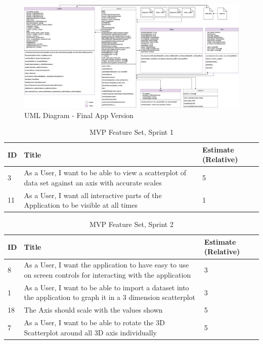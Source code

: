 
\begin{figure}[h]
    \centering
    \includegraphics[width=1\textwidth]{author-files/figures/UML_All_fin.drawio.png}
    \caption{UML Diagram - Final App Version}
    \label{fig:graphfin}
\end{figure}

\begin{table}[h]
    \begin{tabularx}{\textwidth}{ | X | X | X | }
        \hline
        ID & Title                                                                                               & Estimate (Relative) \\
        \hline
        3  & As a User, I want to be able to view a scatterplot of data set against an axis with accurate scales & 5                   \\
        \hline
        11 & As a User, I want all interactive parts of the Application to be visible at all times               & 1                   \\
        \hline
    \end{tabularx}
    \caption{MVP Feature Set, Sprint 1}
    \label{sprint1}
\end{table}

\begin{table}[h]
    \begin{tabularx}{\textwidth}{ | X | X | X | }
        \hline
        ID & Title                                                                                                          & Estimate (Relative) \\
        \hline
        8  & As a User, I want the application to have easy to use on screen controls for interacting with the application  & 3                   \\
        \hline
        1  & As a User, I want to be able to import a dataset into the application to graph it in a 3 dimension scatterplot & 3                   \\
        \hline
        18 & The Axis should scale with the values shown                                                                    & 5                   \\
        \hline
        7  & As a User, I want to be able to rotate the 3D Scatterplot around all 3D axis individually                      & 5                   \\
        \hline
    \end{tabularx}
    \caption{MVP Feature Set, Sprint 2}
    \label{sprint2}
\end{table}

